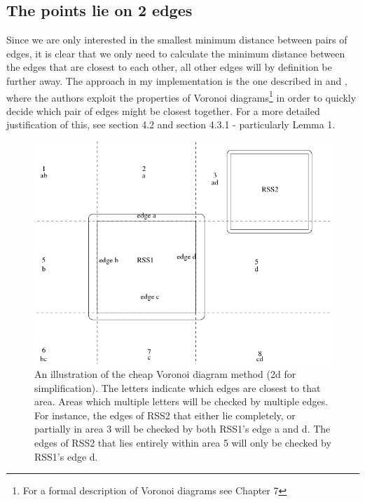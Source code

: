 \subsection{The points lie on 2 edges}
\label{minimumDistance}
Since we are only interested in the smallest minimum distance between pairs of edges, it is clear that we only need to calculate the minimum distance between the edges that are closest to each other, all other edges will by definition be further away. The approach in my implementation is the one described in \cite{larsen00fast} and \cite{Larsen99fastproximity}, where the authors exploit the properties of Voronoi diagrams\footnote{For a formal description of Voronoi diagrams see \cite{compgeom:2008} Chapter 7} in order to quickly decide which pair of edges might be closest together. For a more detailed justification of this, see \cite{larsen00fast} section 4.2 and \cite{Larsen99fastproximity} section 4.3.1 - particularly Lemma 1. 

\begin{figure}
\centering
\includegraphics[width=\textwidth]{figures/vorCheap}
\caption{\label{vor-cheap}An illustration of the cheap Voronoi diagram method (2d for simplification). The letters indicate which edges are closest to that area. Areas which multiple letters will be checked by multiple edges. For instance, the edges of RSS2 that either lie completely, or partially in area 3 will be checked by both RSS1's edge a and d. The edges of RSS2 that lies entirely within area 5 will only be checked by RSS1's edge d.}
\end{figure}

